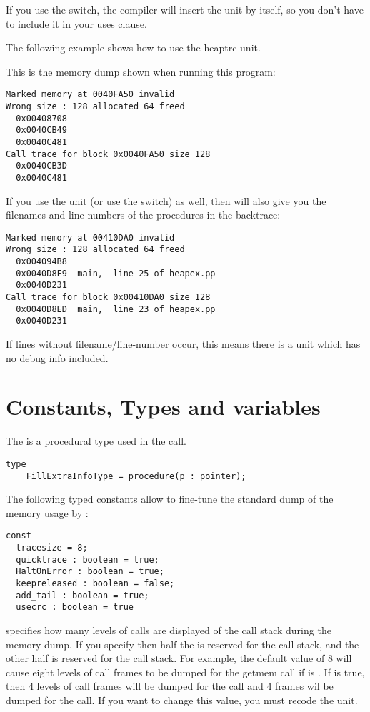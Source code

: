 If you use the  switch, the compiler will insert the unit by itself,
so you don't have to include it in your uses clause.

The following example shows how to use the heaptrc unit.


This is the memory dump shown when running this program:
\begin{verbatim}
Marked memory at 0040FA50 invalid
Wrong size : 128 allocated 64 freed
  0x00408708
  0x0040CB49
  0x0040C481
Call trace for block 0x0040FA50 size 128
  0x0040CB3D
  0x0040C481
\end{verbatim}

If you use the  unit (or use the  switch) as well,
then  will also give you the filenames and line-numbers of
the procedures in the backtrace:
\begin{verbatim}
Marked memory at 00410DA0 invalid
Wrong size : 128 allocated 64 freed
  0x004094B8
  0x0040D8F9  main,  line 25 of heapex.pp
  0x0040D231
Call trace for block 0x00410DA0 size 128
  0x0040D8ED  main,  line 23 of heapex.pp
  0x0040D231
\end{verbatim}
If lines without filename/line-number occur, this means there is a unit which
has no debug info included.

\section{Constants, Types and variables}

The  is a procedural type used in the
 call.

\begin{verbatim}
type
    FillExtraInfoType = procedure(p : pointer);
\end{verbatim}
The following typed constants allow to fine-tune the standard dump of the
memory usage by :

\begin{verbatim}
const
  tracesize = 8;
  quicktrace : boolean = true;
  HaltOnError : boolean = true;
  keepreleased : boolean = false;
  add_tail : boolean = true;
  usecrc : boolean = true
\end{verbatim}

 specifies how many levels of calls are displayed of the 
call stack during the memory dump. If you specify 
then half the  is reserved for the  call stack, 
and the other half is reserved for the  call stack.
For example, the default value of 8 will cause eight levels of call frames
to be dumped for the getmem call if  is . If
 is true, then 4 levels of call frames will be dumped for
the  call and 4 frames wil be dumped for the  call.
If you want to change this value, you must recode the  unit.

